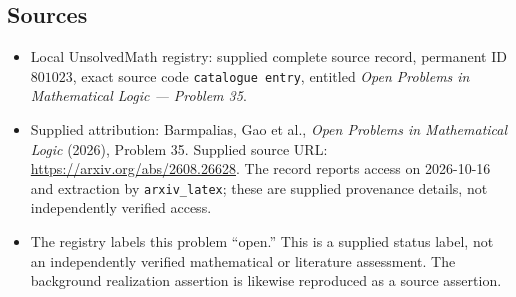 \documentclass[11pt]{article}
\begin{document}
\subsection{Sources}
\begin{itemize}
\item Local UnsolvedMath registry: supplied complete source record, permanent ID \(801023\), exact source code \texttt{catalogue entry}, entitled \emph{Open Problems in Mathematical Logic --- Problem 35}.
\item Supplied attribution: Barmpalias, Gao et al., \emph{Open Problems in Mathematical Logic} (2026), Problem 35. Supplied source URL: \url{https://arxiv.org/abs/2608.26628}. The record reports access on 2026-10-16 and extraction by \texttt{arxiv\_latex}; these are supplied provenance details, not independently verified access.
\item The registry labels this problem ``open.'' This is a supplied status label, not an independently verified mathematical or literature assessment. The background realization assertion is likewise reproduced as a source assertion.
\end{itemize}
\end{document}

